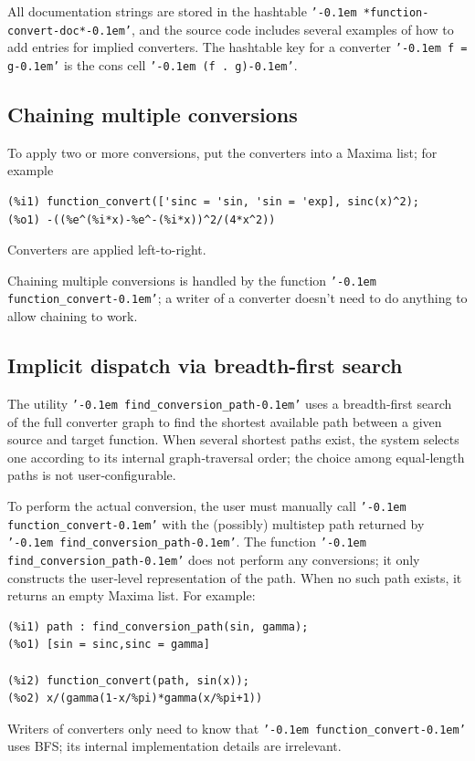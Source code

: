 \documentclass[12pt,fleqn]{extarticle}
\newcommand{\ttq}[1]{\texttt{'\kern-0.1em #1\kern-0.1em'}}
\newcommand{\funconvert}{\ttq{function\_convert}{ }}
\newenvironment{maximabox}
  {\begin{tcolorbox}[
      breakable,
      enhanced,
      colback=white,
      colframe=black!8,
      boxrule=0pt,
      borderline west={2.2pt}{0pt}{black!25},
      arc=1pt,
      left=11pt,
      right=7pt,
      top=9pt,
      bottom=9pt,
      before skip=14pt,
      after skip=14pt
    ]}
  {\end{tcolorbox}}
\begin{document}
All documentation strings are stored in the hashtable \ttq{*function-convert-doc*}, and the
source code includes several examples of how to add entries for implied
converters. The hashtable key for a converter \ttq{f = g} is the cons
cell \ttq{(f . g)}.

\subsection{Chaining multiple conversions}
To apply two or more conversions, put the converters into a Maxima list; for example

\begin{maximabox}
\begin{verbatim}
(%i1) function_convert(['sinc = 'sin, 'sin = 'exp], sinc(x)^2);
(%o1) -((%e^(%i*x)-%e^-(%i*x))^2/(4*x^2))
\end{verbatim}
\end{maximabox}
\noindent Converters are applied left-to-right. 

Chaining multiple conversions is handled by the function \ttq{function\_convert}; a writer of
a converter doesn't need to do anything to allow chaining to work. 

\subsection{Implicit dispatch via breadth-first search}

The utility \ttq{find\_conversion\_path} uses a breadth-first search~\cite{clrs} of the full converter graph to 
find the shortest available path between a given source and target function. When several shortest paths exist, 
the system selects one according to its internal graph‑traversal order; the choice among equal‑length paths 
is not user‑configurable.

To perform the actual conversion, the user must manually call \ttq{function\_convert} with the (possibly) 
multistep path returned by \ttq{find\_conversion\_path}. The function \ttq{find\_conversion\_path} does 
not perform any conversions; it only constructs the user‑level representation of the path.
When no such path exists, it returns an empty Maxima list. For example:
\begin{maximabox}
\begin{verbatim}
(%i1) path : find_conversion_path(sin, gamma);
(%o1) [sin = sinc,sinc = gamma]

(%i2) function_convert(path, sin(x));
(%o2) x/(gamma(1-x/%pi)*gamma(x/%pi+1))
\end{verbatim}
\end{maximabox}
\noindent Writers of converters only need to know that \funconvert uses BFS; its internal implementation
details are irrelevant.
\noindent 
\end{document}
